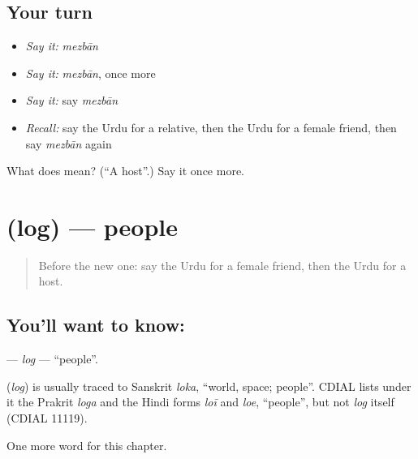 \subsection*{Your turn}
\begin{itemize}
\raggedright
  \item \emph{Say it:} \emph{mezbān}
  \item \emph{Say it:} \emph{mezbān}, once more
  \item \emph{Say it:} say \emph{mezbān}
  \item \emph{Recall:} say the Urdu for a relative, then the Urdu for a female friend, then say \emph{mezbān} again
\end{itemize}

\begin{tcolorbox}[breakable,colback=teal!4,colframe=teal!35!black,title={Before you move on}]
What does  mean? (\textquotedblleft{}A host\textquotedblright{}.) Say it once more.
\end{tcolorbox}
\section[\texorpdfstring{\ur{لوگ} (log)}{لوگ (log)}]{ (log) — people}

\label{lesson:UR-C256-log}



\begin{quote}
Before the new one: say the Urdu for a female friend, then the Urdu for a host.
\end{quote}

\subsection*{You'll want to know: }
\textbf{} — \emph{log} — \textquotedblleft{}people\textquotedblright{}.

\begin{cousinweb}
\textbf{} (\emph{log}) is usually traced to Sanskrit \emph{loka}, \textquotedblleft{}world, space; people\textquotedblright{}. CDIAL lists under it the Prakrit \emph{loga} and the Hindi forms \emph{loī} and \emph{loe}, \textquotedblleft{}people\textquotedblright{}, but not \emph{log} itself (CDIAL 11119).
\end{cousinweb}

\begin{grammarlens}[title={What you've built}]
One more word for this chapter.
\end{grammarlens}

